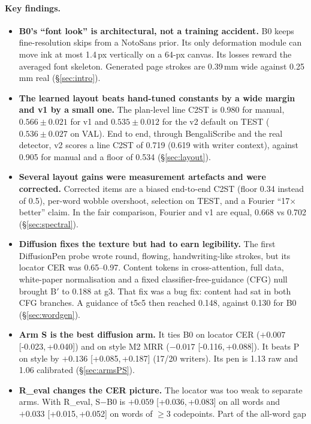 \documentclass[10.5pt,a4paper]{article}
\newcommand{\Bp}{B$'$}
\newcommand{\ci}[2]{{\footnotesize[#1,\,#2]}}
\begin{document}
\paragraph{Key findings.}
\begin{itemize}
\item \textbf{B0's ``font look'' is architectural, not a training accident.} B0 keeps fine-resolution skips from a NotoSans
  prior. Its only deformation module can move ink at most 1.4\,px vertically on a 64-px canvas. Its losses reward the averaged
  font skeleton. Generated page strokes are 0.39\,mm wide against 0.25\,mm real (\S\ref{sec:intro}).
\item \textbf{The learned layout beats hand-tuned constants by a wide margin and v1 by a small one.} The plan-level line C2ST
  is 0.980 for manual, $0.566\pm0.021$ for v1 and $0.535\pm0.012$ for the v2 default on TEST ($0.536\pm0.027$ on VAL). End to
  end, through BengaliScribe and the real detector, v2 scores a line C2ST of 0.719 (0.619 with writer context), against 0.905
  for manual and a floor of 0.534 (\S\ref{sec:layout}).
\item \textbf{Several layout gains were measurement artefacts and were corrected.} Corrected items are a biased end-to-end C2ST
  (floor 0.34 instead of 0.5), per-word wobble overshoot, selection on TEST, and a Fourier ``17$\times$ better'' claim. In the
  fair comparison, Fourier and v1 are equal, 0.668 vs 0.702 (\S\ref{sec:spectral}).
\item \textbf{Diffusion fixes the texture but had to earn legibility.} The first DiffusionPen probe wrote round, flowing,
  handwriting-like strokes, but its locator CER was 0.65--0.97. Content tokens in cross-attention, full data, white-paper
  normalisation and a fixed classifier-free-guidance (CFG) null brought \Bp{} to 0.188 at g3. That fix was a bug fix: content
  had sat in both CFG branches. A guidance of t5c5 then reached 0.148, against 0.130 for B0 (\S\ref{sec:wordgen}).
\item \textbf{Arm S is the best diffusion arm.} It ties B0 on locator CER ($+0.007$ \ci{-0.023}{+0.040}) and on style M2 MRR
  ($-0.017$ \ci{-0.116}{+0.088}). It beats P on style by $+0.136$ \ci{+0.085}{+0.187} (17/20 writers). Its pen is 1.13 raw and
  1.06 calibrated (\S\ref{sec:armsPS}).
\item \textbf{R\_eval changes the CER picture.} The locator was too weak to separate arms. With R\_eval, S$-$B0 is $+0.059$
  \ci{+0.036}{+0.083} on all words and $+0.033$ \ci{+0.015}{+0.052} on words of $\ge$3 codepoints. Part of the all-word gap

\end{itemize}
\end{document}
